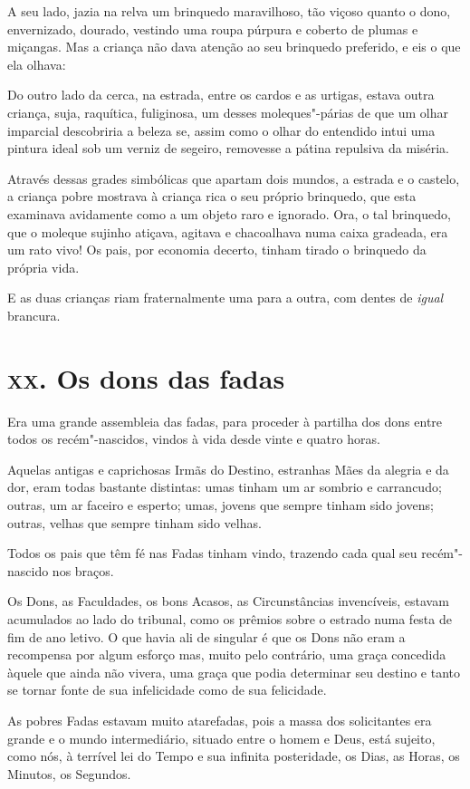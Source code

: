 A seu lado, jazia na relva um brinquedo maravilhoso, tão viçoso
quanto o dono, envernizado, dourado, vestindo uma roupa púrpura
e coberto de plumas e miçangas. Mas a criança não dava atenção ao seu
brinquedo preferido, e eis o que ela olhava:

Do outro lado da cerca, na estrada, entre os cardos e as urtigas, estava
outra criança, suja, raquítica, fuliginosa, um desses moleques"-párias
de que um olhar imparcial descobriria a beleza se, assim como o olhar do
entendido intui uma pintura ideal sob um verniz de segeiro,
removesse a pátina repulsiva da miséria.

Através dessas grades simbólicas que apartam dois mundos, a estrada e o
castelo, a criança pobre mostrava à criança rica o seu próprio
brinquedo, que esta examinava avidamente como a um objeto raro e
ignorado. Ora, o tal brinquedo, que o moleque sujinho atiçava,
agitava e chacoalhava numa caixa gradeada, era um rato vivo! Os pais,
por economia decerto, tinham tirado o brinquedo da própria vida.

E as duas crianças riam fraternalmente uma para a outra, com dentes de
\textit{igual} brancura.

\chapter{\textsc{xx.} Os dons das fadas}

Era uma grande assembleia das fadas, para proceder à partilha dos dons
entre todos os recém"-nascidos, vindos à vida desde vinte e quatro horas.

Aquelas antigas e caprichosas Irmãs do Destino,
estranhas Mães da alegria e da dor, eram todas bastante distintas: umas
tinham um ar sombrio e carrancudo; outras, um ar faceiro e esperto;
umas, jovens que sempre tinham sido jovens; outras, velhas que sempre
tinham sido velhas.

Todos os pais que têm fé nas Fadas tinham vindo, trazendo cada qual seu
recém"-nascido nos braços.

Os Dons, as Faculdades, os bons Acasos, as Circunstâncias invencíveis,
estavam acumulados ao lado do tribunal, como os prêmios sobre o estrado
numa festa de fim de ano letivo. O que havia ali de singular é que os
Dons não eram a recompensa por algum esforço mas, muito pelo contrário,
uma graça concedida àquele que ainda não vivera, uma graça que podia
determinar seu destino e tanto se tornar fonte de sua infelicidade
como de sua felicidade.

As pobres Fadas estavam muito atarefadas, pois a massa dos solicitantes
era grande e o mundo intermediário, situado entre o homem e Deus, está
sujeito, como nós, à terrível lei do Tempo e sua infinita
posteridade, os Dias, as Horas, os Minutos, os Segundos.

